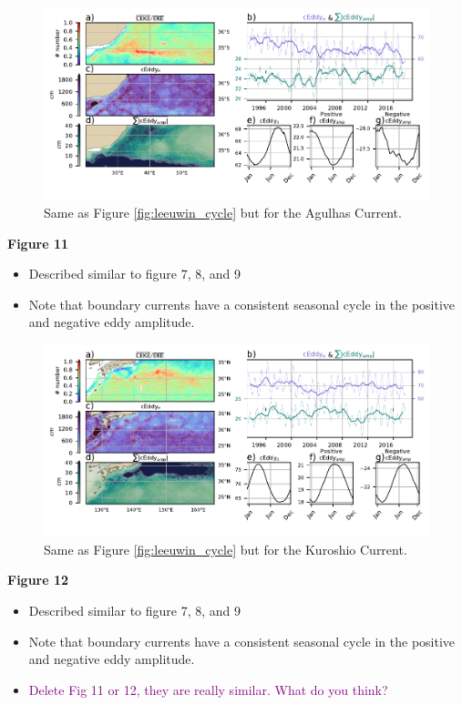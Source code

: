 \documentclass[draft,linenumbers]{agujournal2019}
\begin{document}
	\begin{figure}
	    \centering
	    \includegraphics[width=1\textwidth]{figures/regional_ratios_and_stats_V3_2.pdf}
	    \caption{Same as Figure \ref{fig:leeuwin_cycle} but for the Agulhas Current.}
	    \label{fig:south_atlantic_cycle}
	\end{figure}

	\textbf{Figure 11}
	\begin{itemize}
		\item Described similar to figure 7, 8, and 9
		\item Note that boundary currents have a consistent seasonal cycle in the positive and negative eddy amplitude.
	\end{itemize}

	\begin{figure}
	    \centering
	    \includegraphics[width=1\textwidth]{figures/regional_ratios_and_stats_V3_4.pdf}
	    \caption{Same as Figure \ref{fig:leeuwin_cycle} but for the Kuroshio Current.}
	    \label{fig:south_atlantic_cycle}
	\end{figure}

	\textbf{Figure 12}
	\begin{itemize}
		\item Described similar to figure 7, 8, and 9
		\item Note that boundary currents have a consistent seasonal cycle in the positive and negative eddy amplitude.
		\item \textcolor{purple}{Delete Fig 11 or 12, they are really similar. What do you think?}
	\end{itemize}
\end{document}
